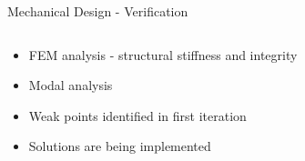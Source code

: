 \documentclass[11pt, aspectratio=169]{beamer}
\begin{document}
\begin{frame}[c]{Mechanical Design - Verification}
    \begin{columns}[t]
            \begin{column}{.5\textwidth}
                \begin{itemize}
                    \item FEM analysis - structural stiffness and integrity
                    \item Modal analysis
                    \item Weak points identified in first iteration
                    \item Solutions are being implemented
                \end{itemize}
            \end{column}


\end{columns}
\end{frame}
\end{document}

